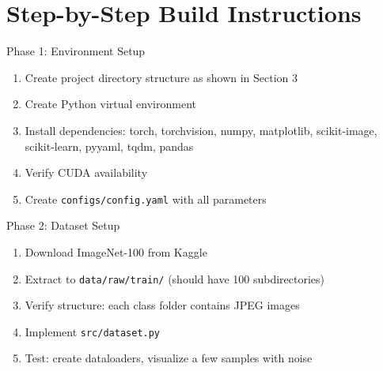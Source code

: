 \documentclass[11pt,a4paper]{article}
\begin{document}
\newpage


\section{Step-by-Step Build Instructions}

\begin{conceptbox}{Phase 1: Environment Setup}
\begin{enumerate}[noitemsep]
    \item Create project directory structure as shown in Section 3
    \item Create Python virtual environment
    \item Install dependencies: torch, torchvision, numpy, matplotlib, scikit-image, scikit-learn, pyyaml, tqdm, pandas
    \item Verify CUDA availability
    \item Create \texttt{configs/config.yaml} with all parameters
\end{enumerate}
\end{conceptbox}

\vspace{0.3cm}

\begin{conceptbox}{Phase 2: Dataset Setup}
\begin{enumerate}[noitemsep]
    \item Download ImageNet-100 from Kaggle
    \item Extract to \texttt{data/raw/train/} (should have 100 subdirectories)
    \item Verify structure: each class folder contains JPEG images
    \item Implement \texttt{src/dataset.py}
    \item Test: create dataloaders, visualize a few samples with noise
\end{enumerate}
\end{conceptbox}

\vspace{0.3cm}
\end{document}
